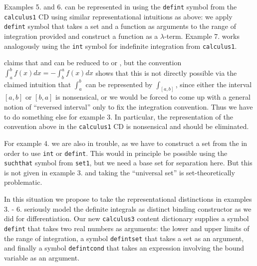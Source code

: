 \documentclass[12pt]{article}
\begin{document}
Examples 5. and 6. can be represented in {\openmath} using the {\texttt{defint}} symbol
from the {\texttt{calculus1}} CD using similar representational intuitions as above: we
apply {\texttt{defint}} symbol that takes a set and a function as arguments to the range
of integration provided and construct a function as a $\lambda$-term. Example 7. works
analogously using the {\texttt{int}} symbol for indefinite integration from
{\texttt{calculus1}}.

{} claims that {} and {} can be reduced to
{} or {}, but the convention
$\int_a^bf(x)dx=-\int_b^af(x)dx$ shows that this is not directly possible via the claimed
intuition that $\int_a^b$ can be represented by $\int_{[a,b]}$, since either the interval
$[a,b]$ or $[b,a]$ is nonsensical, or we would be forced to come up with a general notion
of ``reversed interval'' only to fix the integration convention. Thus we have to do
something else for example 3. In particular, the {} representation of the
convention above in the {\texttt{calculus1}} CD is nonsensical and should be eliminated.

For example 4. we are also in trouble, as we have to construct a set from the
{} in order to use {\texttt{int}} or {\texttt{defint}}. This would in
principle be possible using the {\texttt{suchthat}} symbol from {\texttt{set1}}, but we
need a base set for separation here. But this is not given in example 3. and taking the
``universal set'' is set-theoretically problematic.

In this situation we propose to take the representational distinctions in examples 3. -
6. seriously model the definite integrals as distinct binding constructor as we did for
differentiation. Our new {\texttt{calculus3}} content dictionary supplies a symbol
{\texttt{defint}} that takes two real numbers as arguments: the lower and upper limits of
the range of integration, a symbol {\texttt{defintset}} that takes a set as an argument,
and finally a symbol {\texttt{defintcond}} that takes an expression involving the bound
variable as an argument. 
\end{document}
